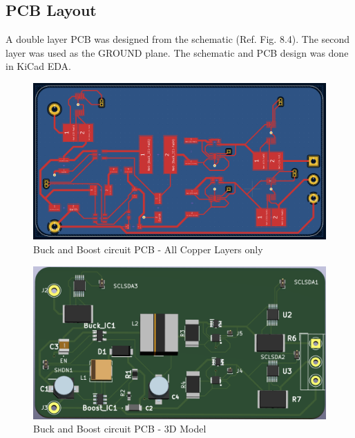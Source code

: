 \subsection{PCB Layout}
 A double layer PCB was designed from the schematic (Ref. Fig. 8.4). The second layer was used as the GROUND plane. The schematic and PCB design was done in KiCad EDA. 
 
  \begin{figure}[H]
 	\centering
 	\includegraphics[width=\columnwidth]{bubopcb.png}
 	\caption{\centering Buck and Boost circuit PCB - All Copper Layers only}
 	\label{fig:bubopcb}
 \end{figure}
 
   \begin{figure}[H]
 	\centering
 	\includegraphics[width=\columnwidth]{bubopcb3d.png}
 	\caption{\centering Buck and Boost circuit PCB - 3D Model}
 	\label{fig:bubopcb3d}
 \end{figure}

\pagebreak
 \justifying
 
